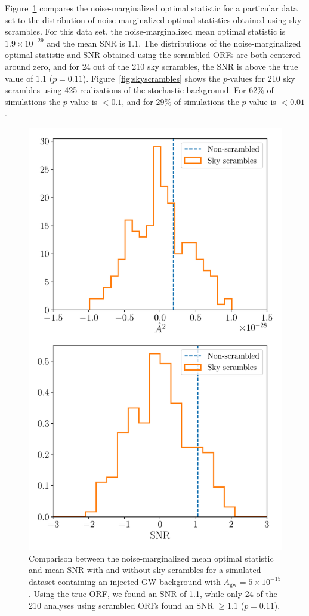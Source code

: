 \documentclass[twocolumn,aps,prd,superscriptaddress]{revtex4-1}
\newcommand{\Agw}{\ensuremath{A_\mathrm{gw}}}
\begin{document}
Figure~\ref{fig:skyscrambles_dataset_sample} compares the noise-marginalized optimal statistic 
for a particular data set to the distribution of noise-marginalized optimal statistics obtained using sky scrambles. 
For this data set, the noise-marginalized mean optimal statistic is 
$1.9\times10^{-29}$ and the mean SNR is 1.1. 
The distributions of the noise-marginalized optimal statistic and SNR obtained using the scrambled ORFs 
are both centered around zero, 
and for 24 out of the 210 sky scrambles, the SNR is above the true value of $1.1$ ($p=0.11$). 
Figure~\ref{fig:skyscrambles} shows the $p$-values for 210 sky scrambles 
using 425 realizations of the stochastic background. 
For 62\% of simulations the $p$-value is $<0.1$, and for 29\% of simulations the $p$-value is $<0.01$.
\begin{figure}[htb]
	\includegraphics[width=0.9\columnwidth]{plots/skyscrambles_dataset50.pdf}
	\caption{Comparison between the noise-marginalized mean optimal statistic and mean SNR 
			with and without sky scrambles for a simulated dataset 
			containing an injected GW background with $\Agw = 5\times10^{-15}$. 
			Using the true ORF, we found an SNR of 1.1, while only 24 of the 210 analyses using scrambled ORFs 
			found an SNR $\geq 1.1$ ($p=0.11$).}
	\label{fig:skyscrambles_dataset_sample}
\end{figure}
\end{document}
